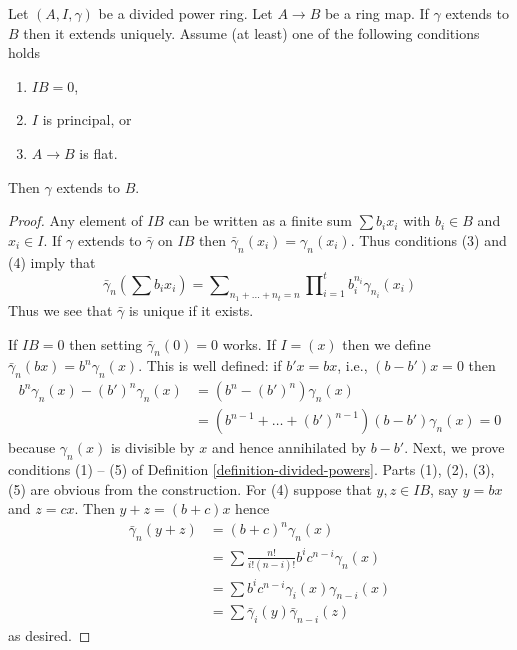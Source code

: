 \begin{lemma}
\label{lemma-gamma-extends}
Let $(A, I, \gamma)$ be a divided power ring.
Let $A \to B$ be a ring map.
If $\gamma$ extends to $B$ then it extends uniquely.
Assume (at least) one of the following conditions holds
\begin{enumerate}
\item $IB = 0$,
\item $I$ is principal, or
\item $A \to B$ is flat.
\end{enumerate}
Then $\gamma$ extends to $B$.
\end{lemma}

\begin{proof}
Any element of $IB$ can be written as a finite sum $\sum b_ix_i$ with
$b_i \in B$ and $x_i \in I$. If $\gamma$ extends to $\bar\gamma$ on $IB$
then $\bar\gamma_n(x_i) = \gamma_n(x_i)$.
Thus conditions (3) and (4) imply that
$$
\bar\gamma_n(\sum b_ix_i) =
\sum\nolimits_{n_1 + \ldots + n_t = n}
\prod\nolimits_{i = 1}^t b_i^{n_i}\gamma_{n_i}(x_i)
$$
Thus we see that $\bar\gamma$ is unique if it exists.

\medskip\noindent
If $IB = 0$ then setting $\bar\gamma_n(0) = 0$ works. If $I = (x)$
then we define $\bar\gamma_n(bx) = b^n\gamma_n(x)$. This is well defined:
if $b'x = bx$, i.e., $(b - b')x = 0$ then
\begin{align*}
b^n\gamma_n(x) - (b')^n\gamma_n(x)
& =
(b^n - (b')^n)\gamma_n(x) \\
& =
(b^{n - 1} + \ldots + (b')^{n - 1})(b - b')\gamma_n(x) = 0
\end{align*}
because $\gamma_n(x)$ is divisible by $x$ and hence annihilated by $b - b'$.
Next, we prove conditions (1) -- (5) of
Definition \ref{definition-divided-powers}.
Parts (1), (2), (3), (5) are obvious from the construction.
For (4) suppose that $y, z \in IB$, say $y = bx$ and $z = cx$. Then
$y + z = (b + c)x$ hence
\begin{align*}
\bar\gamma_n(y + z)
& =
(b + c)^n\gamma_n(x) \\
& =
\sum \frac{n!}{i!(n - i)!}b^ic^{n -i}\gamma_n(x) \\
& =
\sum b^ic^{n - i}\gamma_i(x)\gamma_{n - i}(x) \\
& =
\sum \bar\gamma_i(y)\bar\gamma_{n -i}(z)
\end{align*}
as desired.


\end{proof}
